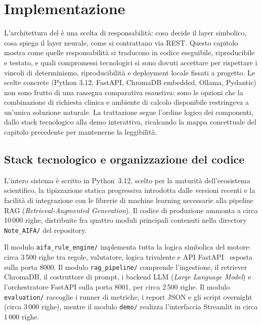 
\chapter{Implementazione}
\label{ch:implementazione}

L'architettura del  è una scelta di responsabilità:
cosa decide il layer simbolico, cosa spiega il layer neurale, come si
contrattano via REST. Questo capitolo mostra come quelle responsabilità si
traducono in codice eseguibile, riproducibile e testato, e quali compromessi
tecnologici si sono dovuti accettare per rispettare i vincoli di
determinismo, riproducibilità e deployment locale fissati a progetto. Le
scelte concrete (Python 3.12, FastAPI, ChromaDB embedded, Ollama, Pydantic)
non sono frutto di una rassegna comparativa esaustiva: sono le opzioni
che la combinazione di richiesta clinica e ambiente di calcolo disponibile
restringeva a un'unica soluzione naturale. La trattazione segue l'ordine
logico dei componenti, dallo stack tecnologico alla demo interattiva,
ricalcando la mappa concettuale del capitolo precedente per mantenerne la
leggibilità.

\section{Stack tecnologico e organizzazione del codice}
\label{sec:stack}

L'intero sistema è scritto in Python~3.12, scelto per la maturità
dell'ecosistema scientifico, la tipizzazione statica progressiva introdotta
dalle versioni recenti e la facilità di integrazione con le librerie di
machine learning necessarie alla pipeline RAG (\emph{Retrieval-Augmented Generation}). Il codice di produzione ammonta
a circa 10\,000 righe, distribuite fra quattro moduli principali contenuti
nella directory \texttt{Note\_AIFA/} del repository.

Il modulo \texttt{aifa\_rule\_engine/} implementa tutta la logica simbolica
del motore: circa 3\,500 righe tra regole, valutatore, logica trivalente
e API FastAPI~\cite{fastapi} esposta sulla porta 8000. Il modulo
\texttt{rag\_pipeline/} comprende l'ingestione, il retriever ChromaDB, il
costruttore di prompt, i backend LLM (\emph{Large Language Model}) e l'orchestratore FastAPI sulla porta
8001, per circa 2\,500 righe. Il modulo \texttt{evaluation/} raccoglie i
runner di metriche, i report JSON e gli script overnight (circa 3\,000
righe), mentre il modulo \texttt{demo/} realizza l'interfaccia Streamlit in
circa 1\,000 righe.

